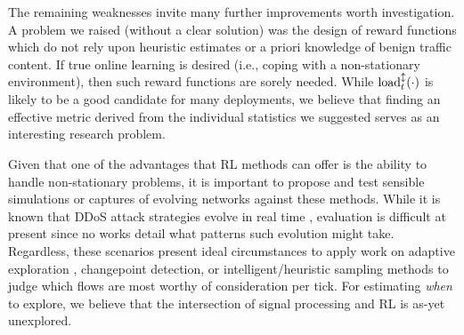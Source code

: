 \documentclass[10pt, times, comsoc]{IEEEtran}
\begin{document}
The remaining weaknesses invite many further improvements worth investigation.
A problem we raised (without a clear solution) was the design of reward functions which do not rely upon heuristic estimates or a priori knowledge of benign traffic content.
If true online learning is desired (i.e., coping with a non-stationary environment), then such reward functions are sorely needed.
While $\operatorname{load}^{\updownarrow}_{t}(\cdot)$ is likely to be a good candidate for many deployments, we believe that finding an effective metric derived from the individual statistics we suggested serves as an interesting research problem.

Given that one of the advantages that RL methods can offer is the ability to handle non-stationary problems, it is important to propose and test sensible simulations or captures of evolving networks against these methods.
While it is known that DDoS attack strategies evolve in real time \cite{DBLP:conf/spw/KangGS16}, evaluation is difficult at present since no works detail what patterns such evolution might take.
Regardless, these scenarios present ideal circumstances to apply work on adaptive exploration \cite{DBLP:conf/annpr/TokicP12}, changepoint detection, or intelligent/heuristic sampling methods to judge which flows are most worthy of consideration per tick.
For estimating \emph{when} to explore, we believe that the intersection of signal processing and RL is as-yet unexplored.
\end{document}

